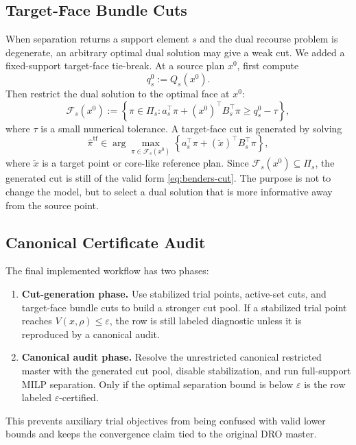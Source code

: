 \documentclass[11pt]{article}
\newcommand{\eps}{\varepsilon}
\begin{document}
\subsection{Target-Face Bundle Cuts}

When separation returns a support element $s$ and the dual recourse problem is
degenerate, an arbitrary optimal dual solution may give a weak cut.  We added a
fixed-support target-face tie-break.  At a source plan $x^0$, first compute
\[
    q^0_s := Q_s(x^0).
\]
Then restrict the dual solution to the optimal face at $x^0$:
\[
    \mathcal F_s(x^0)
    :=
    \left\{
    \pi\in\Pi_s:
    a_s^\top\pi + (x^0)^\top B_s^\top\pi
    \ge q^0_s-\tau
    \right\},
\]
where $\tau$ is a small numerical tolerance.  A target-face cut is generated by
solving
\begin{equation}
    \widehat\pi^{\mathrm{tf}}
    \in
    \arg\max_{\pi\in\mathcal F_s(x^0)}
    \left\{
    a_s^\top\pi + (\widetilde x)^\top B_s^\top\pi
    \right\},
    \label{eq:target-face}
\end{equation}
where $\widetilde x$ is a target point or core-like reference plan.  Since
$\mathcal F_s(x^0)\subseteq\Pi_s$, the generated cut is still of the valid form
\eqref{eq:benders-cut}.  The purpose is not to change the model, but to select
a dual solution that is more informative away from the source point.

\subsection{Canonical Certificate Audit}

The final implemented workflow has two phases:
\begin{enumerate}
    \item \textbf{Cut-generation phase.}  Use stabilized trial points,
    active-set cuts, and target-face bundle cuts to build a stronger cut pool.
    If a stabilized trial point reaches $V(x,\rho)\le\eps$, the row is still
    labeled diagnostic unless it is reproduced by a canonical audit.
    \item \textbf{Canonical audit phase.}  Resolve the unrestricted canonical
    restricted master with the generated cut pool, disable stabilization, and
    run full-support MILP separation.  Only if the optimal separation bound is
    below $\eps$ is the row labeled $\eps$-certified.
\end{enumerate}

This prevents auxiliary trial objectives from being confused with valid lower
bounds and keeps the convergence claim tied to the original DRO master.
\end{document}
